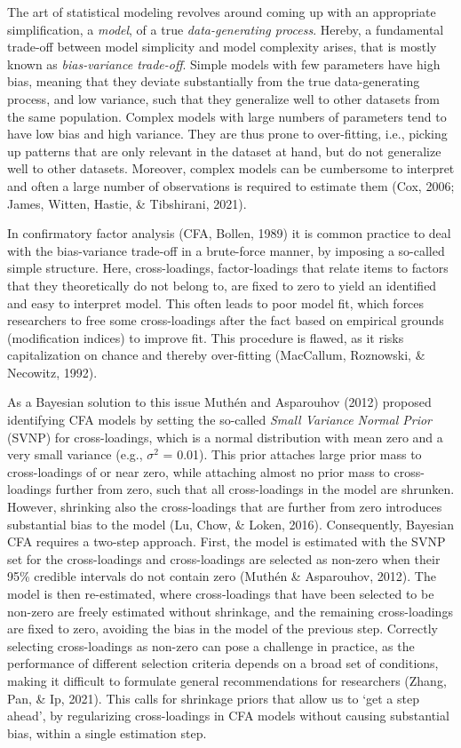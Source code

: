 \documentclass[
  man, donotrepeattitle,floatsintext]{apa6}
\begin{document}
The art of statistical modeling revolves around coming up with an appropriate simplification, a \emph{model}, of a true \emph{data-generating process}. Hereby, a fundamental trade-off between model simplicity and model complexity arises, that is mostly known as \emph{bias-variance trade-off}. Simple models with few parameters have high bias, meaning that they deviate substantially from the true data-generating process, and low variance, such that they generalize well to other datasets from the same population. Complex models with large numbers of parameters tend to have low bias and high variance. They are thus prone to over-fitting, i.e., picking up patterns that are only relevant in the dataset at hand, but do not generalize well to other datasets. Moreover, complex models can be cumbersome to interpret and often a large number of observations is required to estimate them (Cox, 2006; James, Witten, Hastie, \& Tibshirani, 2021).

In confirmatory factor analysis (CFA, Bollen, 1989) it is common practice to deal with the bias-variance trade-off in a brute-force manner, by imposing a so-called simple structure. Here, cross-loadings, factor-loadings that relate items to factors that they
theoretically do not belong to, are fixed to zero to yield an identified and easy to interpret model. This often leads to poor model fit, which forces researchers to free some cross-loadings after the fact based on empirical grounds (modification indices) to improve fit. This procedure is flawed, as it risks capitalization on chance and thereby over-fitting (MacCallum, Roznowski, \& Necowitz, 1992).

As a Bayesian solution to this issue Muthén and Asparouhov (2012) proposed identifying CFA models by setting the so-called \emph{Small Variance Normal Prior} (SVNP) for cross-loadings, which is a normal distribution with mean zero and a very small variance (e.g., \(\sigma^2\) = 0.01). This prior attaches large prior mass to cross-loadings of or near zero, while attaching almost no prior mass to cross-loadings further from zero, such that all cross-loadings in the model are shrunken. However, shrinking also the cross-loadings that are further from zero introduces substantial bias to the model (Lu, Chow, \& Loken, 2016). Consequently, Bayesian CFA requires a two-step approach. First, the model is estimated with the SVNP set for the cross-loadings and cross-loadings are selected as non-zero when their 95\% credible intervals do not contain zero (Muthén \& Asparouhov, 2012). The model is then re-estimated, where cross-loadings that have been selected to be non-zero are freely estimated without shrinkage, and the remaining cross-loadings are fixed to zero, avoiding the bias in the model of the previous step. Correctly selecting cross-loadings as non-zero can pose a challenge in practice, as the performance of different selection criteria depends on a broad set of conditions, making it difficult to formulate general recommendations for researchers (Zhang, Pan, \& Ip, 2021). This calls for shrinkage priors that allow us to `get a step ahead', by regularizing cross-loadings in CFA models without causing substantial bias, within a single estimation step.
\end{document}
